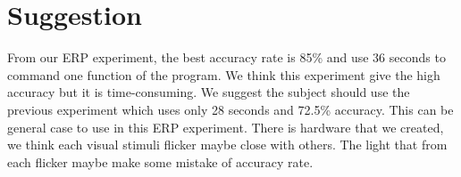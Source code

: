 \section{Suggestion}
\hspace{1.5cm} From our ERP experiment, the best accuracy rate is 85\% and use 36 seconds to command one function of the program. We think this experiment give the high accuracy but it is time-consuming. We suggest the subject should use the previous experiment which uses only 28 seconds and 72.5\% accuracy. This can be general case to use in this ERP experiment.
There is hardware that we created, we think each visual stimuli flicker maybe close with others. The light that from each flicker maybe make some mistake of accuracy rate.
